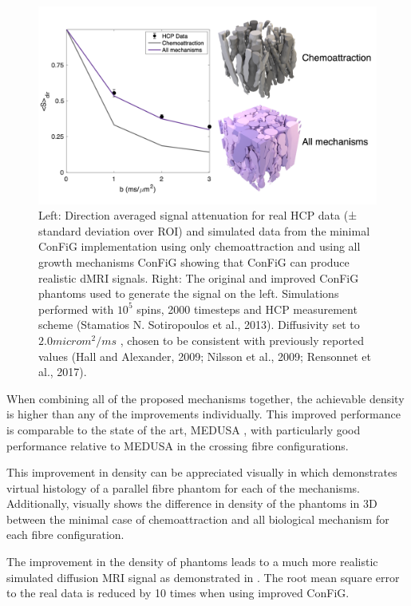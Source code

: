 \begin{figure}
  \centering
  \includegraphics[width=\textwidth]{figures/config/hcp_old_vs_new_figure_whitebg.png}
  \caption[Impact of improvements on simulated dMRI signal]{Left: Direction averaged signal attenuation for real HCP data (± standard deviation over ROI) and simulated data from the minimal ConFiG implementation using only chemoattraction and using all growth mechanisms ConFiG showing that ConFiG can produce realistic dMRI signals. Right: The original and improved ConFiG phantoms used to generate the signal on the left. Simulations performed with $10^5$ spins, 2000 timesteps and HCP measurement scheme (Stamatios N. Sotiropoulos et al., 2013). Diffusivity set to $2.0microm ^2/ms$ , chosen to be consistent with previously reported values (Hall and Alexander, 2009; Nilsson et al., 2009; Rensonnet et al., 2017).  }
  \label{fig:config_res_improvements_sig}
\end{figure}

When combining all of the proposed mechanisms together, the achievable density is higher than any of the improvements individually. This improved performance is comparable to the state of the art, MEDUSA \cite{Ginsburger2019}, with particularly good performance relative to MEDUSA in the crossing fibre configurations.

This improvement in density can be appreciated visually in  which demonstrates virtual histology of a parallel fibre phantom for each of the mechanisms. Additionally,  visually shows the difference in density of the phantoms in 3D between the minimal case of chemoattraction and all biological mechanism for each fibre configuration.

The improvement in the density of phantoms leads to a much more realistic simulated diffusion MRI signal as demonstrated in . The root mean square error to the real data is reduced by 10 times when using improved ConFiG.

